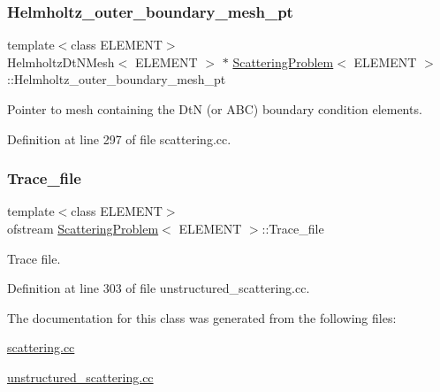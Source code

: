 \subsubsection{\texorpdfstring{Helmholtz\+\_\+outer\+\_\+boundary\+\_\+mesh\+\_\+pt}{Helmholtz\_outer\_boundary\_mesh\_pt}}
{\footnotesize\ttfamily template$<$class E\+L\+E\+M\+E\+NT$>$ \\
Helmholtz\+Dt\+N\+Mesh$<$ E\+L\+E\+M\+E\+NT $>$ $\ast$ \hyperlink{classScatteringProblem}{Scattering\+Problem}$<$ E\+L\+E\+M\+E\+NT $>$\+::Helmholtz\+\_\+outer\+\_\+boundary\+\_\+mesh\+\_\+pt}



Pointer to mesh containing the DtN (or A\+BC) boundary condition elements. 



Definition at line 297 of file scattering.\+cc.

\mbox{\label{classScatteringProblem_a47bb2e90c5817c97ef162136cb331286}} 
\subsubsection{\texorpdfstring{Trace\+\_\+file}{Trace\_file}}
{\footnotesize\ttfamily template$<$class E\+L\+E\+M\+E\+NT$>$ \\
ofstream \hyperlink{classScatteringProblem}{Scattering\+Problem}$<$ E\+L\+E\+M\+E\+NT $>$\+::Trace\+\_\+file}



Trace file. 



Definition at line 303 of file unstructured\+\_\+scattering.\+cc.



The documentation for this class was generated from the following files\+:\begin{DoxyCompactItemize}
\item 
\hyperlink{scattering_8cc}{scattering.\+cc}\item 
\hyperlink{unstructured__scattering_8cc}{unstructured\+\_\+scattering.\+cc}\end{DoxyCompactItemize}

